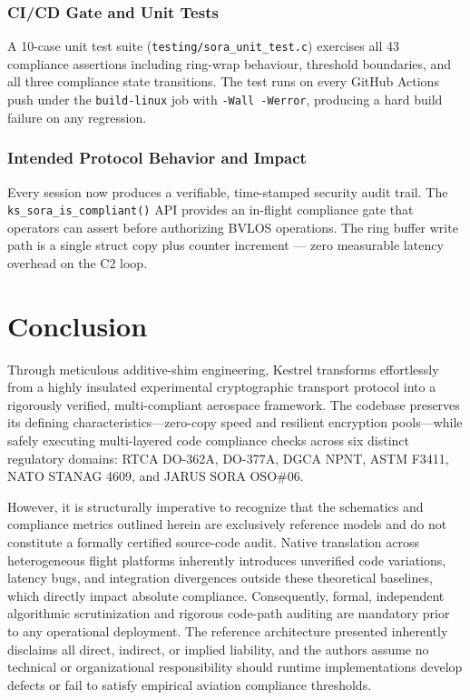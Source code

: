 \documentclass[11pt,a4paper]{article}
\begin{document}
\subsubsection{CI/CD Gate and Unit Tests}
A 10-case unit test suite (\texttt{testing/sora\_unit\_test.c}) exercises all 43 compliance assertions including ring-wrap behaviour, threshold boundaries, and all three compliance state transitions. The test runs on every GitHub Actions push under the \texttt{build-linux} job with \texttt{-Wall -Werror}, producing a hard build failure on any regression.

\subsubsection{Intended Protocol Behavior and Impact}
Every session now produces a verifiable, time-stamped security audit trail. The \texttt{ks\_sora\_is\_compliant()} API provides an in-flight compliance gate that operators can assert before authorizing BVLOS operations. The ring buffer write path is a single struct copy plus counter increment --- zero measurable latency overhead on the C2 loop.

\vspace{0.5cm}

\section{Conclusion}

Through meticulous additive-shim engineering, Kestrel transforms effortlessly from a highly insulated experimental cryptographic transport protocol into a rigorously verified, multi-compliant aerospace framework. The codebase preserves its defining characteristics---zero-copy speed and resilient encryption pools---while safely executing multi-layered code compliance checks across six distinct regulatory domains: RTCA DO-362A, DO-377A, DGCA NPNT, ASTM F3411, NATO STANAG 4609, and JARUS SORA OSO\#06.

However, it is structurally imperative to recognize that the schematics and compliance metrics outlined herein are exclusively reference models and do not constitute a formally certified source-code audit. Native translation across heterogeneous flight platforms inherently introduces unverified code variations, latency bugs, and integration divergences outside these theoretical baselines, which directly impact absolute compliance. Consequently, formal, independent algorithmic scrutinization and rigorous code-path auditing are mandatory prior to any operational deployment. The reference architecture presented inherently disclaims all direct, indirect, or implied liability, and the authors assume no technical or organizational responsibility should runtime implementations develop defects or fail to satisfy empirical aviation compliance thresholds.
\end{document}

